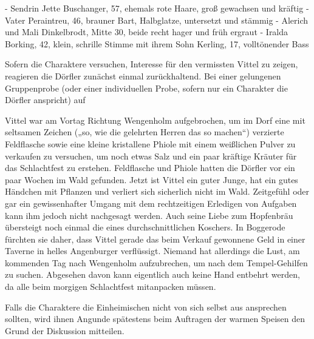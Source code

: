 - Sendrin Jette Buschanger, 57, ehemals rote Haare, groß gewachsen und kräftig
- Vater Peraintreu, 46, brauner Bart, Halbglatze, untersetzt und stämmig
- Alerich und Mali Dinkelbrodt, Mitte 30, beide recht hager und früh ergraut
- Iralda Borking, 42, klein, schrille Stimme mit ihrem Sohn Kerling, 17, volltönender Bass

Sofern die Charaktere versuchen, Interesse für den vermissten Vittel zu zeigen, reagieren die Dörfler zunächst einmal zurückhaltend. Bei einer gelungenen Gruppenprobe (oder einer individuellen Probe, sofern nur ein Charakter die Dörfler anspricht) auf 
\platz

\platz
Vittel war am Vortag Richtung Wengenholm aufgebrochen, um im Dorf eine mit seltsamen Zeichen („so, wie die gelehrten Herren das so machen“) verzierte Feldflasche sowie eine kleine kristallene Phiole mit einem weißlichen Pulver zu verkaufen zu versuchen, um noch etwas Salz und ein paar kräftige Kräuter für das Schlachtfest zu erstehen. Feldflasche und Phiole hatten die Dörfler vor ein paar Wochen im Wald gefunden. Jetzt ist Vittel ein guter Junge, hat ein gutes Händchen mit Pflanzen und verliert sich sicherlich nicht im Wald. Zeitgefühl oder gar ein gewissenhafter Umgang mit dem rechtzeitigen Erledigen von Aufgaben kann ihm jedoch nicht nachgesagt werden. Auch seine Liebe zum Hopfenbräu übersteigt noch einmal die eines durchschnittlichen Koschers. In Boggerode fürchten sie daher, dass Vittel gerade das beim Verkauf gewonnene Geld in einer Taverne in helles Angenburger verflüssigt. Niemand hat allerdings die Lust, am kommenden Tag nach Wengenholm aufzubrechen, um nach dem Tempel-Gehilfen zu suchen. Abgesehen davon kann eigentlich auch keine Hand entbehrt werden, da alle beim morgigen Schlachtfest mitanpacken müssen.

\platz
Falls die Charaktere die Einheimischen nicht von sich selbst aus ansprechen sollten, wird ihnen Angunde spätestens beim Auftragen der warmen Speisen den Grund der Diskussion mitteilen.
\platz





